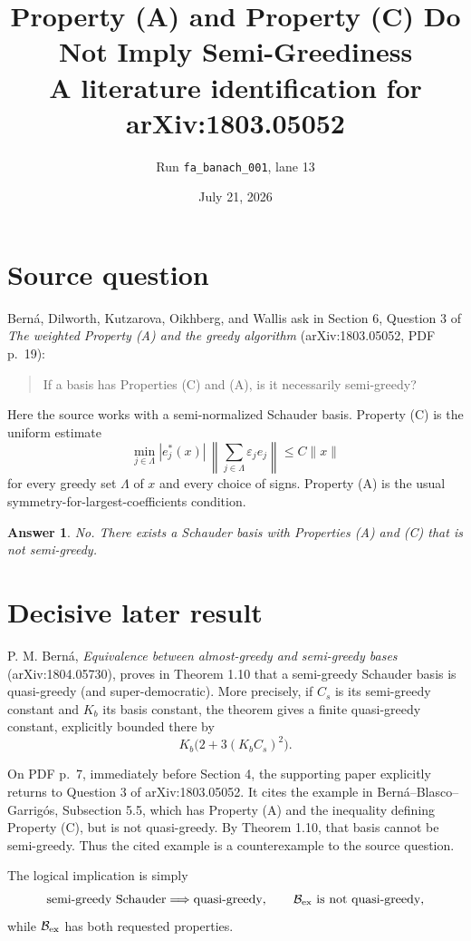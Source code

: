 \documentclass[11pt]{article}
\title{Property (A) and Property (C) Do Not Imply Semi-Greediness\\
\large A literature identification for arXiv:1803.05052}
\author{Run \texttt{fa\_banach\_001}, lane 13}
\date{July 21, 2026}
\newtheorem*{answer}{Answer}
\newcommand{\cB}{\mathcal B}
\begin{document}
\maketitle

\section*{Source question}

Bern\'a, Dilworth, Kutzarova, Oikhberg, and Wallis ask in Section 6,
Question 3 of \emph{The weighted Property (A) and the greedy algorithm}
(arXiv:1803.05052, PDF p.~19):
\begin{quote}
If a basis has Properties (C) and (A), is it necessarily semi-greedy?
\end{quote}
Here the source works with a semi-normalized Schauder basis.  Property (C)
is the uniform estimate
\[
 \min_{j\in\Lambda}|e_j^*(x)|\,
 \left\|\sum_{j\in\Lambda}\varepsilon_j e_j\right\|
 \le C\|x\|
\]
for every greedy set $\Lambda$ of $x$ and every choice of signs.  Property
(A) is the usual symmetry-for-largest-coefficients condition.

\begin{answer}
No.  There exists a Schauder basis with Properties (A) and (C) that is not
semi-greedy.
\end{answer}

\section*{Decisive later result}

P. M. Bern\'a, \emph{Equivalence between almost-greedy and semi-greedy
bases} (arXiv:1804.05730), proves in Theorem 1.10 that a semi-greedy
Schauder basis is quasi-greedy (and super-democratic).  More precisely, if
$C_s$ is its semi-greedy constant and $K_b$ its basis constant, the theorem
gives a finite quasi-greedy constant, explicitly bounded there by
\[
 K_b\bigl(2+3(K_bC_s)^2\bigr).
\]

On PDF p.~7, immediately before Section 4, the supporting paper explicitly
returns to Question 3 of arXiv:1803.05052.  It cites the example in
Bern\'a--Blasco--Garrig\'os, Subsection 5.5, which has Property (A) and the
inequality defining Property (C), but is not quasi-greedy.  By Theorem 1.10,
that basis cannot be semi-greedy.  Thus the cited example is a counterexample
to the source question.

The logical implication is simply
\[
 \text{semi-greedy Schauder}
 \Longrightarrow \text{quasi-greedy},
 \qquad
 \cB_{\rm ex}\text{ is not quasi-greedy},
\]
while $\cB_{\rm ex}$ has both requested properties.
\end{document}
